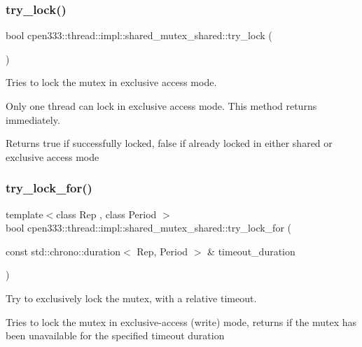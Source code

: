 \subsubsection{\texorpdfstring{try\+\_\+lock()}{try\_lock()}}
{\footnotesize\ttfamily bool cpen333\+::thread\+::impl\+::shared\+\_\+mutex\+\_\+shared\+::try\+\_\+lock (\begin{DoxyParamCaption}{ }\end{DoxyParamCaption})\hspace{0.3cm}{\ttfamily [inline]}}



Tries to lock the mutex in exclusive access mode. 

Only one thread can lock in exclusive access mode. This method returns immediately.

\begin{DoxyReturn}{Returns}
true if successfully locked, false if already locked in either shared or exclusive access mode 
\end{DoxyReturn}
\mbox{\label{classcpen333_1_1thread_1_1impl_1_1shared__mutex__shared_a354b81f50045cbb68a8bb295222e4b5b}} 
\subsubsection{\texorpdfstring{try\+\_\+lock\+\_\+for()}{try\_lock\_for()}}
{\footnotesize\ttfamily template$<$class Rep , class Period $>$ \\
bool cpen333\+::thread\+::impl\+::shared\+\_\+mutex\+\_\+shared\+::try\+\_\+lock\+\_\+for (\begin{DoxyParamCaption}\item[{const std\+::chrono\+::duration$<$ Rep, Period $>$ \&}]{timeout\+\_\+duration }\end{DoxyParamCaption})\hspace{0.3cm}{\ttfamily [inline]}}



Try to exclusively lock the mutex, with a relative timeout. 

Tries to lock the mutex in exclusive-\/access (write) mode, returns if the mutex has been unavailable for the specified timeout duration


